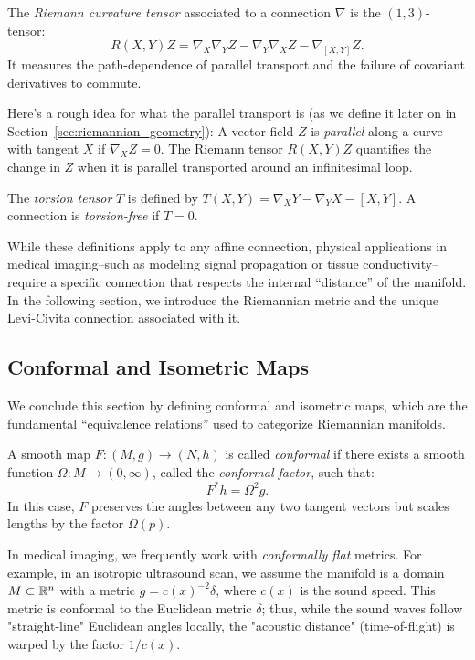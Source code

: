 \begin{definition}
  The \emph{Riemann curvature tensor} associated to a connection $\nabla$ is the $(1,3)$-tensor:
  \[%
    R(X,Y)Z = \nabla_X \nabla_Y Z - \nabla_Y \nabla_X Z - \nabla_{[X,Y]} Z
  .\]%
  It measures the path-dependence of parallel transport and the failure of covariant derivatives to commute.
\end{definition}

Here's a rough idea for what the parallel transport is (as we define it later on in Section~\ref{sec:riemannian_geometry}): A vector field $Z$ is \emph{parallel} along a curve with tangent $X$ if $\nabla_X Z = 0$. The Riemann tensor $R(X, Y)Z$ quantifies the change in $Z$ when it is parallel transported around an infinitesimal loop.

\begin{definition}
  The \emph{torsion tensor} $T$ is defined by $T(X,Y) = \nabla_X Y - \nabla_Y X - [X,Y]$. A connection is \emph{torsion-free} if $T = 0$.
\end{definition}

While these definitions apply to any affine connection, physical applications in medical imaging--such as modeling signal propagation or tissue conductivity--require a specific connection that respects the internal ``distance'' of the manifold. In the following section, we introduce the Riemannian metric and the unique Levi-Civita connection associated with it.

\subsection{Conformal and Isometric Maps} We conclude this section by defining conformal and isometric maps, which are the fundamental ``equivalence relations'' used to categorize Riemannian manifolds.

\begin{definition}
  A smooth map $F : (M, g) \to (N, h)$ is called \emph{conformal} if there exists a smooth function $\Omega : M \to (0, \infty)$, called the \emph{conformal factor}, such that:
  \[%
    F^*h = \Omega^2 g
  .\]%
  In this case, $F$ preserves the angles between any two tangent vectors but scales lengths by the factor $\Omega(p)$.
\end{definition}

In medical imaging, we frequently work with \emph{conformally flat} metrics. For example, in an isotropic ultrasound scan, we assume the manifold is a domain $M \subset \mathbb{R}^n$ with a metric $g = c(x)^{-2} \delta$, where $c(x)$ is the sound speed. This metric is conformal to the Euclidean metric $\delta$; thus, while the sound waves follow "straight-line" Euclidean angles locally, the "acoustic distance" (time-of-flight) is warped by the factor $1/c(x)$.

